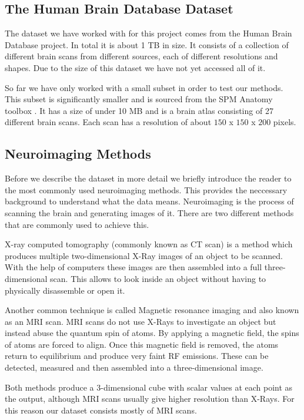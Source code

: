 \label{sec:dataset}

\subsection{The Human Brain Database Dataset}

The dataset we have worked with for this project comes from the Human Brain Database project. In total it is about 1 TB in size. It consists of a collection of different brain scans from different sources, each of different resolutions and shapes. Due to the size of this dataset we have not yet accessed all of it.

So far we have only worked with a small subset in order to test our methods. This subset is significantly smaller and is sourced from the SPM Anatomy toolbox \cite{SPMAnatomyToolbox:website}. It has a size of under 10 MB and is a brain atlas consisting of 27 different brain scans. Each scan has a resolution of about $150$ x $150$ x $200$ pixels.

\subsection{Neuroimaging Methods}

Before we describe the dataset in more detail we briefly introduce the reader to the most commonly used neuroimaging methods. This provides the neccessary background to understand what the data means. Neuroimaging is the process of scanning the brain and generating images of it. There are two different methods that are commonly used to achieve this.

X-ray computed tomography (commonly known as CT scan) is a method which produces multiple two-dimensional X-Ray images of an object to be scanned. With the help of computers these images are then assembled into a full three-dimensional scan. This allows to look inside an object without having to physically disassemble or open it.

Another common technique is called Magnetic resonance imaging and also known as an MRI scan. MRI scans do not use X-Rays to investigate an object but instead abuse the quantum spin of atoms. By applying a magnetic field, the spins of atoms are forced to align. Once this magnetic field is removed, the atoms return to equilibrium and produce very faint RF emissions. These can be detected, measured and then assembled into a three-dimensional image.

Both methods produce a 3-dimensional cube with scalar values at each point as the output, although MRI scans usually give higher resolution than X-Rays. For this reason our dataset consists mostly of MRI scans.

